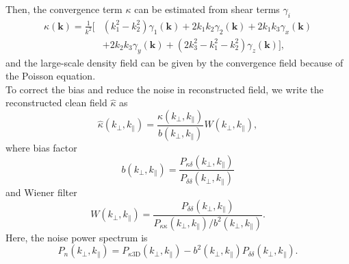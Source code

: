 Then, the convergence term $\kappa$ can be estimated from shear terms 
$\gamma_{i}$ 
 \begin{equation}
 \label{equ:kappa3D}
 \begin{split}
 \kappa(\bm{k})=
 \frac{1}{k^{2}}
 [
&(k_{1}^{2}-k_{2}^{2})\gamma_{1}(\bm{k})
 +2k_{1}k_{2}\gamma_{2}(\bm{k}) 
 +2k_{1}k_{3}\gamma_{x}(\bm{k})\\
&+2k_{2}k_{3}\gamma_{y}(\bm{k})
 +(2k_{3}^2-k_1^2-k_2^2)\gamma_{z}(\bm{k})
 ],
 \end{split}
 \end{equation}
and the large-scale density field can be given by the convergence field
because of the Poisson equation.\\
To correct the bias and reduce the noise in reconstructed field,
 we write the reconstructed clean field $\hat{\kappa}$ as 
\begin{equation}
\label{eq: kappa}
\hat{\kappa}(k_{\perp},k_{\parallel})=\frac{\kappa(k_{\perp},k_{\parallel})}{b(k_{\perp},k_{\parallel})} W(k_{\perp},k_{\parallel}),
\end{equation}
where bias factor 
\begin{equation}
b(k_{\perp},k_{\parallel})=\frac{P_{\kappa\delta}(k_{\perp},k_{\parallel})}{P_{\delta\delta}(k_{\perp},k_{\parallel})}
\label{equ:bias}
\end{equation}
 and Wiener filter 
\begin{equation}
W(k_{\perp},k_{\parallel})=\frac{P_{\delta\delta}(k_{\perp},k_{\parallel})}{P_{\kappa\kappa}(k_{\perp},k_{\parallel})/b^{2}(k_{\perp},k_{\parallel})}.
\end{equation}
Here, the noise power spectrum is 
\begin{equation}
P_{n}(k_{\perp},k_{\parallel})=P_{\kappa 3\mathrm{D}}(k_{\perp},k_{\parallel})-b^2(k_{\perp},k_{\parallel})P_{\delta\delta}(k_{\perp},k_{\parallel}).
\end{equation}
